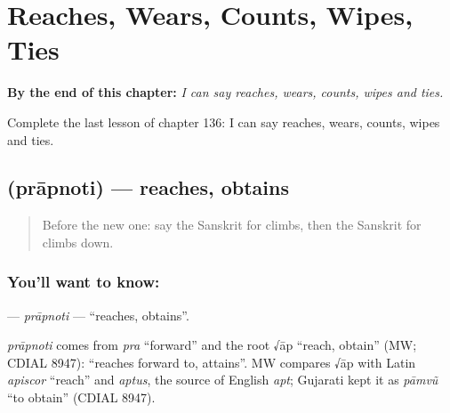 
\chapter{Reaches, Wears, Counts, Wipes, Ties}
\label{ch:sa-reaches-wears-counts-wipes-ties}

\begin{chapteropening}
\textbf{By the end of this chapter:} \emph{I can say reaches, wears, counts, wipes and ties.}

Complete the last lesson of chapter 136: I can say reaches, wears, counts, wipes and ties.
\end{chapteropening}

\section[\texorpdfstring{\sk{प्राप्नोति} (prāpnoti)}{प्राप्नोति (prāpnoti)}]{ (prāpnoti) — reaches, obtains}

\label{lesson:SA-C136-prapnoti}



\begin{quote}
Before the new one: say the Sanskrit for climbs, then the Sanskrit for climbs down.
\end{quote}

\subsection*{You'll want to know: }
\textbf{} — \emph{prāpnoti} — \textquotedblleft{}reaches, obtains\textquotedblright{}.

\begin{cousinweb}
\emph{prāpnoti} comes from \emph{pra} \textquotedblleft{}forward\textquotedblright{} and the root √āp \textquotedblleft{}reach, obtain\textquotedblright{} (MW; CDIAL 8947): \textquotedblleft{}reaches forward to, attains\textquotedblright{}. MW compares √āp with Latin \emph{apiscor} \textquotedblleft{}reach\textquotedblright{} and \emph{aptus}, the source of English \emph{apt}; Gujarati kept it as \emph{pāmvũ} \textquotedblleft{}to obtain\textquotedblright{} (CDIAL 8947).
\end{cousinweb}

